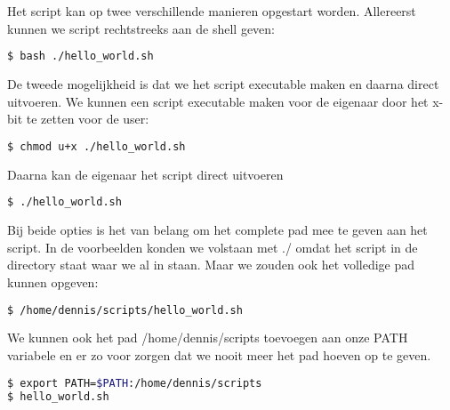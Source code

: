 Het script kan op twee verschillende manieren opgestart worden. Allereerst kunnen we script rechtstreeks aan de shell geven:
\begin{lstlisting}[language=bash]
$ bash ./hello_world.sh
\end{lstlisting}
De tweede mogelijkheid is dat we het script executable maken en daarna direct uitvoeren. We kunnen een script executable maken voor de eigenaar door het x-bit te zetten voor de user:
\begin{lstlisting}[language=bash]
$ chmod u+x ./hello_world.sh
\end{lstlisting}
Daarna kan de eigenaar het script direct uitvoeren
\begin{lstlisting}[language=bash]
$ ./hello_world.sh
\end{lstlisting}
Bij beide opties is het van belang om het complete pad mee te geven aan het script. In de voorbeelden konden we volstaan met ./ omdat het script in de directory staat waar we al in staan. Maar we zouden ook het volledige pad kunnen opgeven:
\begin{lstlisting}[language=bash]
$ /home/dennis/scripts/hello_world.sh
\end{lstlisting}
We kunnen ook het pad /home/dennis/scripts toevoegen aan onze PATH variabele en er zo voor zorgen dat we nooit meer het pad hoeven op te geven.
\begin{lstlisting}[language=bash]
$ export PATH=$PATH:/home/dennis/scripts
$ hello_world.sh
\end{lstlisting}
